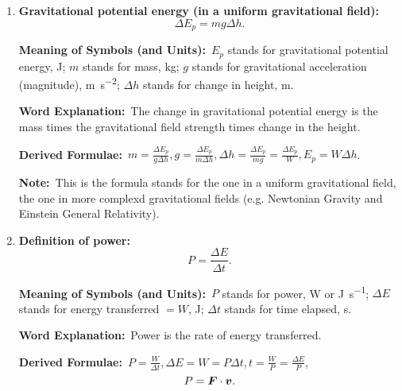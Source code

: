 \documentclass[8pt]{article}
\newcommand{\MeanSymb}{\textbf{Meaning of Symbols (and Units):}\ }
\newcommand{\WordExpl}{\textbf{Word Explanation:}\ }
\newcommand{\DeriForm}{\textbf{Derived Formulae:}\ }
\newcommand{\Note}{\textbf{Note:}\ }
\begin{document}
\begin{enumerate}
                \MeanSymb \(E_k\) stands for kinetic energy, \unit{\joule}; \(m\) stands for mass, \unit{\kilogram}; \(v\) stands for speed or magnitude of velocity, \unit{\metre\per\second}.

                \WordExpl The kinetic energy is half the mass times energy squared.
                
                \DeriForm \(v = \sqrt{\frac{2 E_k}{m}}\).

                \Note Energy is always a scalar. It makes no difference using speed or dot product of velocity here. Note that \(\Delta E_k \neq \frac{1}{2} m \Delta v^2\).

                \item \textbf{Gravitational potential energy (in a uniform gravitational field):}
                \[
                    \Delta E_p = m g \Delta h.
                \]

                \MeanSymb \(E_p\) stands for gravitational potential energy, \unit{\joule}; \(m\) stands for mass, \unit{\kilogram}; \(g\) stands for gravitational acceleration (magnitude), \unit{\metre\per\second\squared}; \(\Delta h\) stands for change in height, \unit{\metre}.

                \WordExpl The change in gravitational potential energy is the mass times the gravitational field strength times change in the height.

                \DeriForm \(m = \frac{\Delta E_p}{g \Delta h}, g = \frac{\Delta E_p}{m \Delta h}, \Delta h = \frac{\Delta E_p}{mg} = \frac{\Delta E_p}{W}, E_p = W \Delta h\).

                \Note This is the formula stands for the one in a uniform gravitational field, the one in more complexd gravitational fields (e.g. Newtonian Gravity and Einstein General Relativity).

                \item \textbf{Definition of power:}
                \[
                    P = \frac{\Delta E}{\Delta t}.
                \]

                \MeanSymb \(P\) stands for power, \unit{\watt} or \unit{\joule\per\second}; \(\Delta E\) stands for energy transferred \(= W\), \unit{\joule}; \(\Delta t\) stands for time elapsed, \unit{\second}.

                \WordExpl Power is the rate of energy transferred.

                \DeriForm \(P = \frac{W}{\Delta t}, \Delta E = W = P \Delta t, t = \frac{W}{P} = \frac{\Delta E}{P}\),
                \[
                    P = \boldsymbol{F} \cdot \boldsymbol{v}.
                \]


\end{enumerate}
\end{document}
